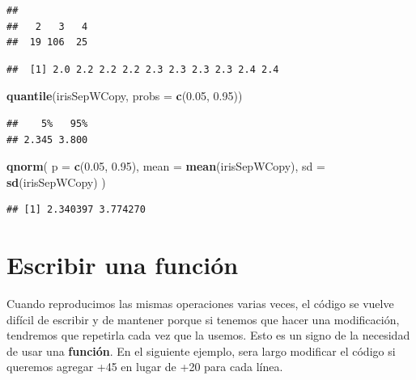 \documentclass[
]{book}
\newenvironment{Shaded}{\begin{snugshade}}{\end{snugshade}}
\newcommand{\DataTypeTok}[1]{\textcolor[rgb]{0.13,0.29,0.53}{#1}}
\newcommand{\DecValTok}[1]{\textcolor[rgb]{0.00,0.00,0.81}{#1}}
\newcommand{\FloatTok}[1]{\textcolor[rgb]{0.00,0.00,0.81}{#1}}
\newcommand{\KeywordTok}[1]{\textcolor[rgb]{0.13,0.29,0.53}{\textbf{#1}}}
\newcommand{\NormalTok}[1]{#1}
\newcommand{\OperatorTok}[1]{\textcolor[rgb]{0.81,0.36,0.00}{\textbf{#1}}}
\newcommand{\StringTok}[1]{\textcolor[rgb]{0.31,0.60,0.02}{#1}}
\begin{document}
\begin{verbatim}
## 
##   2   3   4 
##  19 106  25
\end{verbatim}

\begin{Shaded}
\end{Shaded}

\begin{verbatim}
##  [1] 2.0 2.2 2.2 2.2 2.3 2.3 2.3 2.3 2.4 2.4
\end{verbatim}

\begin{Shaded}
\begin{Highlighting}[]
\KeywordTok{quantile}\NormalTok{(irisSepWCopy, }\DataTypeTok{probs =} \KeywordTok{c}\NormalTok{(}\FloatTok{0.05}\NormalTok{, }\FloatTok{0.95}\NormalTok{))}
\end{Highlighting}
\end{Shaded}

\begin{verbatim}
##    5%   95% 
## 2.345 3.800
\end{verbatim}

\begin{Shaded}
\begin{Highlighting}[]
\KeywordTok{qnorm}\NormalTok{(}
  \DataTypeTok{p =} \KeywordTok{c}\NormalTok{(}\FloatTok{0.05}\NormalTok{, }\FloatTok{0.95}\NormalTok{), }
  \DataTypeTok{mean =} \KeywordTok{mean}\NormalTok{(irisSepWCopy), }
  \DataTypeTok{sd =} \KeywordTok{sd}\NormalTok{(irisSepWCopy)}
\NormalTok{)}
\end{Highlighting}
\end{Shaded}

\begin{verbatim}
## [1] 2.340397 3.774270
\end{verbatim}

\hypertarget{l015function}{%
\section{Escribir una función}\label{l015function}}

Cuando reproducimos las mismas operaciones varias veces, el código se vuelve difícil de escribir y de mantener porque si tenemos que hacer una modificación, tendremos que repetirla cada vez que la usemos. Esto es un signo de la necesidad de usar una \textbf{función}. En el siguiente ejemplo, sera largo modificar el código si queremos agregar +45 en lugar de +20 para cada línea.
\end{document}
